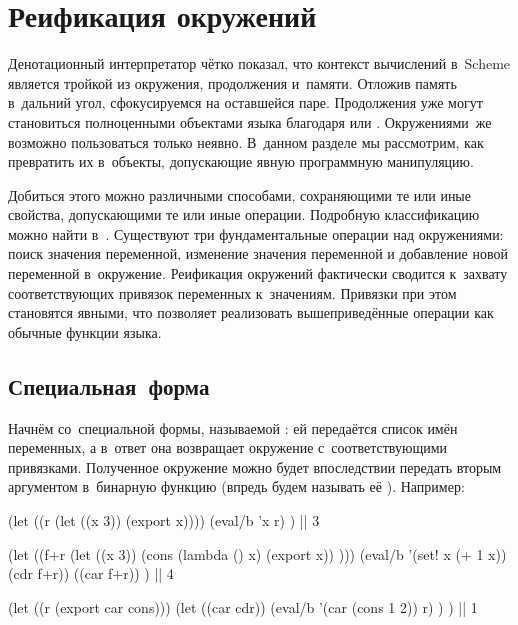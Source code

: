 \section{Реификация окружений}\label{reflection/sect:reify-env}

Денотационный интерпретатор чётко показал, что контекст вычислений в~Scheme
является тройкой из окружения, продолжения и~памяти. Отложив память в~дальний
угол, сфокусируемся на оставшейся паре. Продолжения уже могут становиться
полноценными объектами языка благодаря  или .
Окружениями~же возможно пользоваться только неявно. В~данном разделе мы
рассмотрим, как превратить их в~объекты, допускающие явную программную
манипуляцию.

Добиться этого можно различными способами, сохраняющими те или иные свойства,
допускающими те или иные операции. Подробную классификацию можно найти
в~\cite{ra82,mr91}. Существуют три фундаментальные операции над окружениями:
поиск значения переменной, изменение значения переменной и добавление новой
переменной в~окружение. Реификация окружений фактически сводится к~захвату
соответствующих привязок переменных к~значениям. Привязки при этом становятся
явными, что позволяет реализовать вышеприведённые операции как обычные функции
языка.


\subsection{\texorpdfstring{Специальная~форма \protect{}}%
{Специальная форма export}}%
\label{reflection/reify-env/ssect:export}

Начнём со~специальной формы, называемой : ей передаётся список имён
переменных, а в~ответ она возвращает окружение с~соответствующими привязками.
Полученное окружение можно будет впоследствии передать вторым аргументом
в~бинарную функцию  (впредь будем называть её ). Например:


\begin{code:lisp}
(let ((r (let ((x 3)) (export x))))
  (eval/b 'x r) )                    |\is| 3

(let ((f+r (let ((x 3))
             (cons (lambda () x) (export x)) )))
  (eval/b '(set! x (+ 1 x)) (cdr f+r))
  ((car f+r)) )                      |\is| 4

(let ((r (export car cons)))
  (let ((car cdr))
    (eval/b '(car (cons 1 2)) r) ) ) |\is| 1
\end{code:lisp}

